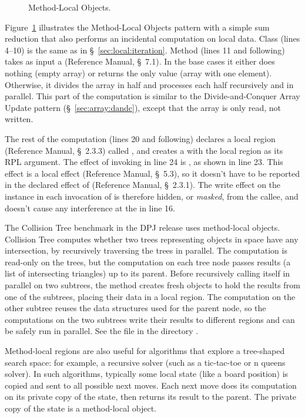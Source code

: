 \begin{figure}

\caption{Method-Local Objects.}
\label{fig:local:method:pattern}
\end{figure}

Figure~\ref{fig:local:method:pattern} illustrates the Method-Local
Objects pattern with a simple sum reduction that also performs an
incidental computation on local data.  Class  (lines
4--10) is the same as in \S~\ref{sec:local:iteration}.  Method
 (lines 11 and following) takes as input a
 (Reference Manual, \S~7.1).  In the base cases it
either does nothing (empty array) or returns the only value (array
with one element).  Otherwise, it divides the array in half and
processes each half recursively and in parallel.  This part of the
computation is similar to the Divide-and-Conquer Array Update pattern
(\S~\ref{sec:array:dandc}), except that the array is only read, not
written.

The rest of the computation (lines 20 and following) declares a local
region (Reference Manual, \S~2.3.3) called , and
creates a  with the local region as its RPL argument.
The effect of invoking  in line 24 is
, as shown in line 23.  This effect is a local
effect (Reference Manual, \S~5.3), so it doesn't have to be reported
in the declared effect of  (Reference Manual,
\S~2.3.1).  The write effect on the  instance in each
invocation of  is therefore hidden, or \emph{masked},
from the callee, and doesn't cause any interference at the
 in line 16.


 The Collision Tree benchmark in the DPJ
release uses method-local objects.  Collision Tree computes whether
two trees representing objects in space have any intersection, by
recursively traversing the trees in parallel.  The computation is
read-only on the trees, but the computation on each tree node passes
results (a list of intersecting triangles) up to its parent.  Before
recursively calling itself in parallel on two subtrees, the
 method creates fresh objects to hold the results
from one of the subtrees, placing their data in a local region.
The computation on the other subtree reuses the data structures 
used for the parent node, so the computations on the two subtrees
write their results to different regions and can be safely run in
parallel.  See the file  in the directory
.

Method-local regions are also useful for algorithms that explore a
tree-shaped search space: for example, a recursive solver (such as a
tic-tac-toe or n queens solver).  In such algorithms, typically some
local state (like a board position) is copied and sent to all possible
next moves.  Each next move does its computation on its private copy
of the state, then returns its result to the parent.  The private copy
of the state is a method-local object.


